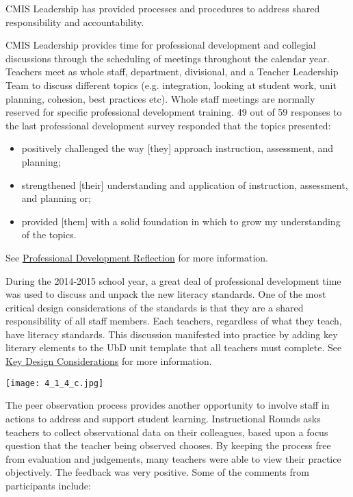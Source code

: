 \begin{findings}
CMIS Leadership has provided processes and procedures to address shared responsibility and accountability. 


CMIS Leadership provides time for professional development and collegial discussions through the scheduling of meetings throughout the calendar year. Teachers meet as whole staff, department, divisional, and a Teacher Leadership Team to discuss different topics (e.g. integration, looking at student work, unit planning, cohesion, best practices etc). Whole staff meetings are normally reserved for specific professional development training. 49 out of 59 responses to the last professional development survey responded that the topics presented: 

\begin{itemize}
\item positively challenged the way [they] approach instruction, assessment, and planning; 
\item strengthened [their] understanding and application of instruction, assessment, and planning or; 
\item provided [them] with a solid foundation in which to grow my understanding of the topics.
\end{itemize}

See \href{https://docs.google.com/a/cmis.ac.th/forms/d/1-00JLey-jyLuizymm8z8JGJ6iLp4l-ccsTgHJ_Ckcj8/viewanalytics}{Professional Development Reflection} for more information. 

During the 2014-2015 school year, a great deal of professional development time was used to discuss and unpack the new literacy standards. One of the most critical design considerations of the standards is that they are a shared responsibility of all staff members. Each teachers, regardless of what they teach, have literacy standards. This discussion manifested into practice by adding key literary elements to the UbD unit template that all teachers must complete. See \href{http://www.corestandards.org/ELA-Literacy/introduction/key-design-consideration/}{Key Design Considerations} for more information. 

\texttt{[image: 4\_1\_4\_c.jpg]}
		
\href{https://docs.google.com/a/cmis.ac.th/presentation/d/1j9DjUPHbIprWWbftcBxiF35BKmzU5C_lW9Z78f8CAeE/edit?usp=sharing}{}
The peer observation process provides another opportunity to involve staff in actions to address and support student learning. Instructional Rounds asks teachers to collect observational data on their colleagues, based upon a focus question that the teacher being observed chooses. By keeping the process free from evaluation and judgements, many teachers were able to view their practice objectively. The feedback was very positive. Some of the comments from participants include:


\end{findings}
